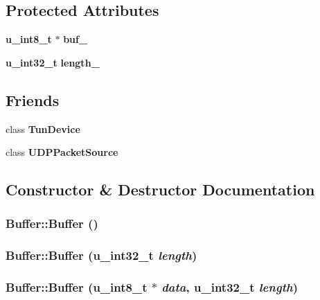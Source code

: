 \subsection*{Protected Attributes}
\begin{CompactItemize}
\item 
{\bf u\_\-int8\_\-t} $\ast$ {\bf buf\_\-}
\item 
{\bf u\_\-int32\_\-t} {\bf length\_\-}
\end{CompactItemize}
\subsection*{Friends}
\begin{CompactItemize}
\item 
class {\bf Tun\-Device}
\item 
class {\bf UDPPacket\-Source}
\end{CompactItemize}


\subsection{Constructor \& Destructor Documentation}
\subsubsection{\setlength{\rightskip}{0pt plus 5cm}Buffer::Buffer ()}\label{classBuffer_e7ef2cd201190fde551dcb902627112b}


\subsubsection{\setlength{\rightskip}{0pt plus 5cm}Buffer::Buffer ({\bf u\_\-int32\_\-t} {\em length})}\label{classBuffer_5c58aa9e491f709011408ee7837d57d0}


\subsubsection{\setlength{\rightskip}{0pt plus 5cm}Buffer::Buffer ({\bf u\_\-int8\_\-t} $\ast$ {\em data}, {\bf u\_\-int32\_\-t} {\em length})}\label{classBuffer_5bc2edccfb7c1a33354c895ab25c4816}


